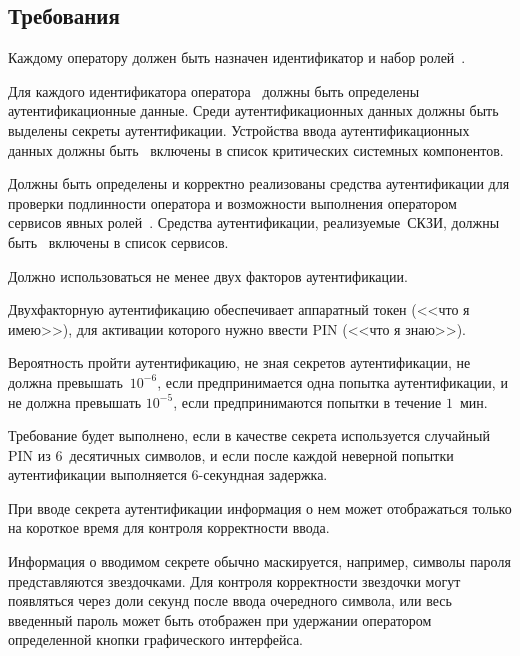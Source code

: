 \subsection{Требования}\label{IA.Reqs}

\label{R.IA.Id}
Каждому оператору должен быть назначен идентификатор и набор 
ролей~.

\label{R.IA.AuthData}
Для каждого идентификатора оператора~
должны быть определены аутентификационные данные. 
Среди аутентификационных данных должны быть выделены 
секреты аутентификации.
%
Устройства ввода аутентификационных данных должны быть~ 
включены в список критических системных компонентов. 

\label{R.IA.Auth}
Должны быть определены и корректно реализованы средства 
аутентификации для проверки подлинности оператора и возможности 
выполнения оператором сервисов явных ролей~.
%
Средства аутентификации, реализуемые~СКЗИ, 
должны быть~ включены в список сервисов.

\label{R.IA.2FA}
Должно использоваться не менее двух факторов аутентификации.

\begin{note}
Двухфакторную аутентификацию обеспечивает аппаратный токен (<<что я имею>>), 
для активации которого нужно ввести  PIN (<<что я знаю>>).
\end{note}

\label{R.IA.AuthStrength}
Вероятность пройти аутентификацию, 
не зная секретов аутентификации, 
не должна превышать~$10^{-6}$, 
если предпринимается одна попытка аутентификации, 
и не должна превышать $10^{-5}$, 
если предпринимаются попытки в течение $1$~мин.

\begin{note}
Требование будет выполнено, если в качестве секрета используется случайный PIN
из $6$~десятичных символов, и если после каждой неверной попытки аутентификации
выполняется $6$-секундная задержка.
\end{note}

\label{R.IA.PwdMask}
При вводе секрета аутентификации информация о нем может отображаться только на 
короткое время для контроля корректности ввода.

\begin{note}
Информация о вводимом секрете обычно маскируется, например, символы пароля
представляются звездочками. Для контроля корректности звездочки могут появляться
через доли секунд после ввода очередного символа, или весь введенный пароль может
быть отображен при удержании оператором определенной кнопки графического
интерфейса.
\end{note}

